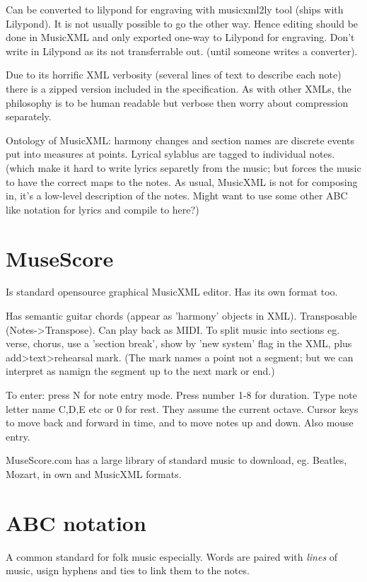 \documentclass[oneside,english]{scrbook}
\begin{document}
Can be converted to lilypond for engraving with musicxml2ly tool (ships with Lilypond). It is not usually possible to go the other way. Hence editing should be done in MusicXML and only exported one-way to Lilypond for engraving.  Don't write in Lilypond as its not transferrable out. (until someone writes a converter).

Due to its horrific XML verbosity (several lines of text to describe each note) there is a zipped version included in the specification. As with other XMLs, the philosophy is to be human readable but verbose then worry about compression separately.


Ontology of MusicXML: harmony changes and section names are discrete events put into measures at points.  Lyrical sylablus are tagged to individual notes. (which make it hard to write lyrics separetly from the music; but forces the music to have the correct maps to the notes.  As usual, MusicXML is not for composing in, it's a low-level description of the notes. Might want to use some other ABC like notation for lyrics and compile to here?)

\section{MuseScore}
Is standard opensource graphical MusicXML editor. Has its own format too.   

Has semantic guitar chords (appear as 'harmony' objects in XML). Transposable (Notes->Transpose). Can play back as MIDI. To split music into sections eg. verse, chorus, use a 'section break', show by 'new system' flag in the XML, plus add>text>rehearsal mark. (The mark names a point not a segment; but we can interpret as namign the segment up to the next mark or end.)

To enter: press N for note entry mode. Press number 1-8 for duration. Type note letter name C,D,E etc or 0 for rest. They assume the current octave.  Cursor keys to move back and forward in time, and to move notes up and down. Also mouse entry.

MuseScore.com has a large library of standard music to download, eg. Beatles, Mozart, in own and MusicXML formats.

\section{ABC notation}

A common standard for folk music especially.   Words are paired with {\em lines} of music, usign hyphens and ties to link them to the notes.
\end{document}
